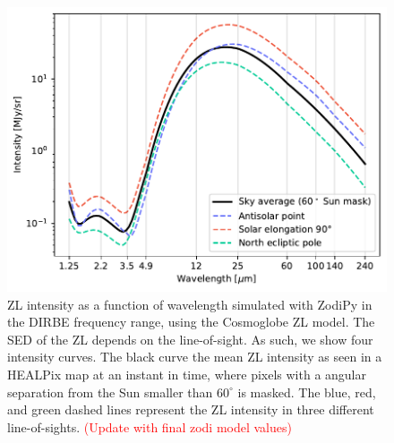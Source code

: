 \documentclass{aa}
\begin{document}
  \begin{figure}
    \centering
    \includegraphics[width=\columnwidth]{figs/zodi_intensity.pdf}
    \caption{ZL intensity as a function of wavelength simulated with ZodiPy in 
    the DIRBE frequency range, using the Cosmoglobe ZL model. The SED of the 
    ZL depends on the line-of-sight. As such, we show four intensity curves. 
    The black curve the mean ZL intensity as seen in a HEALPix map at an 
    instant in time, where pixels with a angular separation from the Sun 
    smaller than $60^\circ$ is masked. The blue, red, and green dashed lines 
    represent the ZL intensity in three different line-of-sights. 
    \textcolor{red}{(Update with final zodi model values)}}
    \label{fig:zodi-intensity}
\end{figure}
\end{document}
